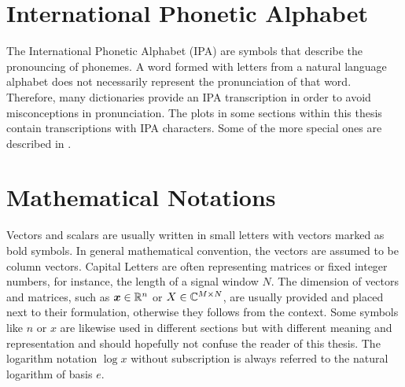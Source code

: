 
\section{International Phonetic Alphabet}\label{sec:appendix_ipa}
The International Phonetic Alphabet (IPA) are symbols that describe the pronouncing of phonemes.
A word formed with letters from a natural language alphabet does not necessarily represent the pronunciation of that word.
Therefore, many dictionaries provide an IPA transcription in order to avoid misconceptions in pronunciation.
The plots in some sections within this thesis contain transcriptions with IPA characters.
Some of the more special ones are described in .




\section{Mathematical Notations}\label{sec:appendix_math}
Vectors and scalars are usually written in small letters with vectors marked as bold symbols.
In general mathematical convention, the vectors are assumed to be column vectors.
Capital Letters are often representing matrices or fixed integer numbers, for instance, the length of a signal window $N$.
The dimension of vectors and matrices, such as $\bm{x} \in \mathbb{R}^n$ or $X \in \mathbb{C}^{M \times N}$, are usually provided and placed next to their formulation, otherwise they follows from the context.
Some symbols like $n$ or $x$ are likewise used in different sections but with different meaning and representation and should hopefully not confuse the reader of this thesis.
The logarithm notation $\log x$ without subscription is always referred to the natural logarithm of basis $e$.